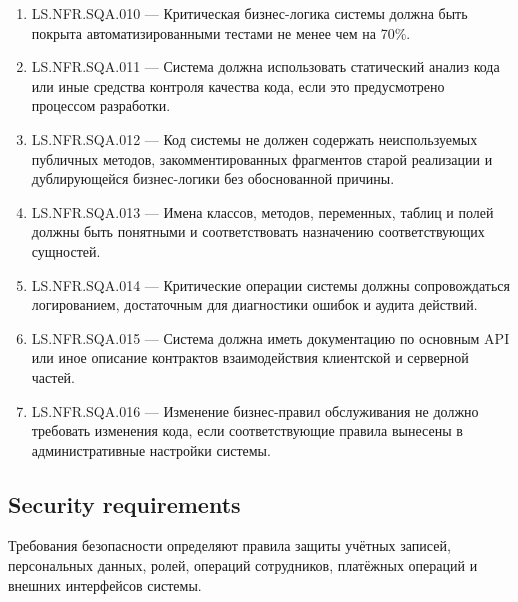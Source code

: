 \documentclass[12pt,a4paper]{article}
\begin{document}
\begin{enumerate}
		\item LS.NFR.SQA.010 --- Критическая бизнес-логика системы должна быть покрыта
		автоматизированными тестами не менее чем на 70\%.
		
		\item LS.NFR.SQA.011 --- Система должна использовать статический анализ кода
		или иные средства контроля качества кода, если это предусмотрено процессом
		разработки.
		
		\item LS.NFR.SQA.012 --- Код системы не должен содержать неиспользуемых публичных
		методов, закомментированных фрагментов старой реализации и дублирующейся
		бизнес-логики без обоснованной причины.
		
		\item LS.NFR.SQA.013 --- Имена классов, методов, переменных, таблиц и полей должны
		быть понятными и соответствовать назначению соответствующих сущностей.
		
		\item LS.NFR.SQA.014 --- Критические операции системы должны сопровождаться
		логированием, достаточным для диагностики ошибок и аудита действий.
		
		\item LS.NFR.SQA.015 --- Система должна иметь документацию по основным API
		или иное описание контрактов взаимодействия клиентской и серверной частей.
		
		\item LS.NFR.SQA.016 --- Изменение бизнес-правил обслуживания не должно требовать
		изменения кода, если соответствующие правила вынесены в административные
		настройки системы.
	\end{enumerate}
	
	\subsection{Security requirements}
	
	Требования безопасности определяют правила защиты учётных записей, персональных
	данных, ролей, операций сотрудников, платёжных операций и внешних интерфейсов
	системы.
	
\end{document}
